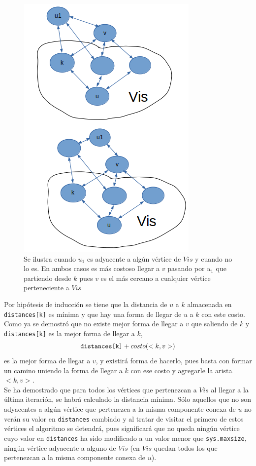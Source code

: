 \documentclass[a4paper,12pt,twocolumn]{article}
\begin{document}
			\begin{figure} [h!]
				\centering
				\includegraphics[width=0.8\linewidth]{figura1}
				\caption{Se ilustra cuando $u_1$ es adyacente a algún vértice de $Vis$ y cuando no lo es. En ambos casos es más costoso llegar a $v$ pasando por $u_1$ que partiendo desde $k$ pues $v$ es el más cercano a cualquier vértice perteneciente a $Vis$}
				\label{fig:figura1}
			\end{figure}
			
			Por hipótesis de inducción se tiene que la distancia de $u$ a $k$ almacenada en \texttt{\ttfamily distances[k]} es mínima y que hay una forma de llegar de $u$ a $k$ con este costo. Como ya se demostró que no existe mejor forma de llegar a $v$ que saliendo de $k$ y \texttt{\ttfamily distances[k]} es la mejor forma de llegar a $k$, $$\texttt{\ttfamily distances[k]} + costo(<k, v>)$$ es la mejor forma de llegar a $v$, y existirá forma de hacerlo, pues basta con formar un camino uniendo la forma de llegar a $k$ con ese costo y agregarle la arista $<k, v>$.\\
			
			Se ha demostrado que para todos los vértices que pertenezcan a $Vis$ al llegar a la última iteración, se habrá calculado la distancia mínima. Sólo aquellos que no son adyacentes a algún vértice que pertenezca a la misma componente conexa de $u$ no verán su valor en \texttt{\ttfamily distances} cambiado y al tratar de visitar el primero de estos vértices el algoritmo se detendrá, pues significará que no queda ningún 	vértice cuyo valor en \texttt{\ttfamily distances} ha sido modificado a un valor menor que \texttt{\ttfamily sys.maxsize}, ningún vértice adyacente a alguno de $Vis$ (en $Vis$ quedan todos los que pertenezcan a la misma componente conexa de $u$).
\end{document}
